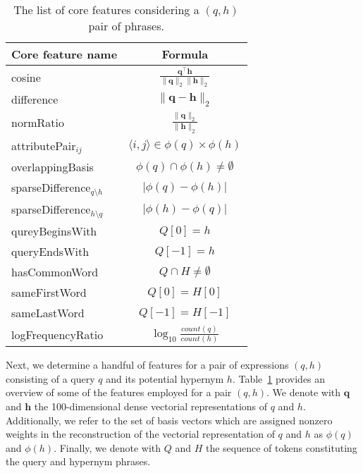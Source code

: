 \documentclass[11pt,a4paper]{article}
\begin{document}
\begin{table}
	\begin{tabular}{lc}
    \toprule
		Core feature name   & Formula \\
    \midrule
		{cosine}            & $\frac{\mathbf{q}^\intercal \mathbf{h}}{\lVert \mathbf{q} \rVert_2\lVert \mathbf{h} \rVert_2}$ \\ %
		{difference}        & $\lVert \mathbf{q} - \mathbf{h} \rVert_2$ \\ %
		{normRatio}         & $\frac{\lVert \mathbf{q}\rVert_2}{\lVert \mathbf{h} \rVert_2}$ \\ %
    \midrule
    attributePair$_{ij}$      & $\langle i,j\rangle\in\phi(q)\times\phi(h)$ \\ %
		{overlappingBasis}  & $\phi(q) \cap \phi(h) \neq \emptyset$ \\ %
		{sparseDifference$_{q\setminus h}$} & $\lvert \phi(q) - \phi(h) \rvert$ \\ %
		{sparseDifference$_{h\setminus q}$} & $\lvert \phi(h) - \phi(q) \rvert$ \\
    \midrule
		{qureyBeginsWith}   & $Q[0] = h$ \\ %
		{queryEndsWith}     & $Q[-1] = h$ \\
		{hasCommonWord} & $Q \cap H \neq \emptyset$ \\ %
		{sameFirstWord}        & $Q[0] = H[0]$ \\ %
		{sameLastWord}        & $Q[-1] = H[-1]$ \\
		{logFrequencyRatio} & $\log_{10}\frac{count(q)}{count(h)}$ \\ %
    \bottomrule
	\end{tabular}
	\caption{The list of core features considering a $(q,h)$ pair of phrases.}
	\label{table:core_features}
\end{table}

Next, we determine a handful of features for a pair of expressions $(q, h)$
consisting of a query $q$ and its potential hypernym $h$.
Table~\ref{table:core_features} provides an overview of some of the features
employed for a pair $(q, h)$.
We denote with $\mathbf{q}$ and $\mathbf{h}$ the 100-dimensional dense
vectorial representations of $q$ and $h$.
Additionally, we refer to the set of basis vectors which are assigned nonzero
weights in the reconstruction of the vectorial representation of $q$ and $h$ as
$\phi(q)$ and $\phi(h)$.
Finally, we denote with $Q$ and $H$ the sequence of tokens constituting the
query and hypernym phrases.
\end{document}
